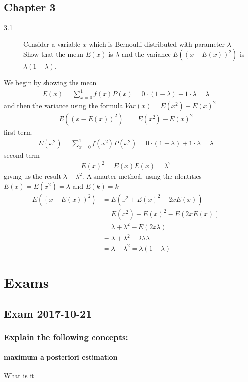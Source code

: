 \documentclass[10pt,a4paper]{article}
\newenvironment{prob}[1]%
   {%
    \begin{description}\item[#1]}%
   {\end{description}}
\begin{document}
\subsection{Chapter 3}
\begin{prob}{3.1}
  Consider a variable $x$ which is Bernoulli distributed with
  parameter $\lambda$. Show that the mean $E(x)$ is $\lambda$ and the
  variance $E((x - E(x))^2)$ is $\lambda(1 - \lambda)$.
\end{prob}
We begin by showing the mean
\begin{align}
  E(x) = \sum_{x=0}^1f(x)P(x) = 0\cdot(1-\lambda) + 1\cdot\lambda = \lambda
\end{align}
and then the variance using the formula $Var(x) = E(x^2) - E(x)^2$
\begin{align}
  E((x - E(x))^2) &= E(x^2) - E(x)^2
\end{align}
first term
\begin{align}
  E(x^2) = \sum_{x=0}^1f(x^2)P(x^2) = 0\cdot(1-\lambda) + 1\cdot\lambda = \lambda
\end{align}
second term
\begin{align}
  E(x)^2 = E(x)E(x) = \lambda^2
\end{align}
giving us the result $\lambda - \lambda^2$. A smarter method, using
the identities $E(x) = E(x^2) = \lambda$ and $E(k) = k$
\begin{align}
  E((x-E(x))^2) &= E(x^2 + E(x)^2 - 2xE(x))\\
  &= E(x^2) + E(x)^2 - E(2xE(x))\\
  &= \lambda + \lambda^2 - E(2x\lambda)\\
  &= \lambda + \lambda^2 - 2\lambda\lambda\\
  &= \lambda - \lambda^2 = \lambda(1-\lambda)
\end{align}


\section{Exams}

\subsection{Exam 2017-10-21}

\subsubsection{Explain the following concepts:}

\paragraph{maximum a posteriori estimation}

What is it
\end{document}
